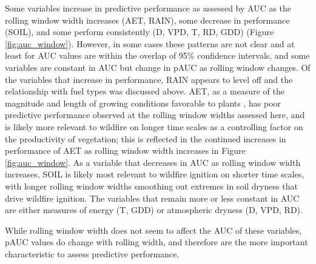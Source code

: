 \documentclass[11p]{article}
\begin{document}
Some variables increase in predictive performance as assessed by AUC as the rolling window width increases (AET, RAIN), some decrease in performance (SOIL), and some perform consistently (D, VPD, T, RD, GDD) (Figure \ref{fig:auc_window}). However, in some cases these patterns are not clear and at least for AUC values are within the overlap of 95\% confidence intervals, and some variables are constant in AUC but change in pAUC as rolling window changes. Of the variables that increase in performance, RAIN appears to level off and the relationship with fuel types was discussed above. AET, as a measure of the magnitude and length of growing conditions favorable to plants \citep{stephensonActualEvapotranspirationDeficit1998}, has poor predictive performance observed at the rolling window widths assessed here, and is likely more relevant to wildfire on longer time scales as a controlling factor on the productivity of vegetation; this is reflected in the continued increases in performance of AET as rolling window width increases in Figure \ref{fig:auc_window}. As a variable that decreases in AUC as rolling window width increases, SOIL is likely most relevant to wildfire ignition on shorter time scales, with longer rolling window widths smoothing out extremes in soil dryness that drive wildfire ignition. The variables that remain more or less constant in AUC are either measures of energy (T, GDD) or atmospheric dryness (D, VPD, RD). %

While rolling window width does not seem to affect the AUC of these variables, pAUC values do change with rolling width, and therefore are the more important characteristic to assess predictive performance.

\end{document}
